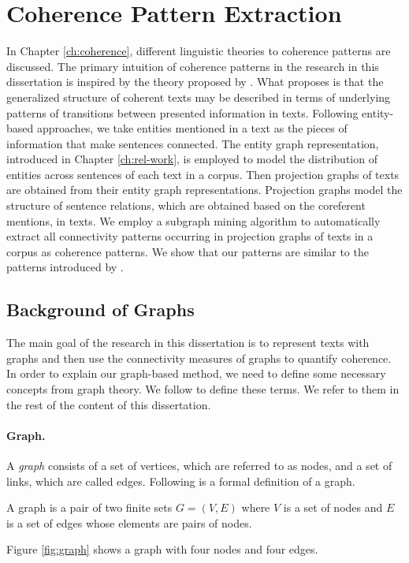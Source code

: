 \section{Coherence Pattern Extraction}
\label{sec:pattern-extraction}

In Chapter \ref{ch:coherence}, different linguistic theories to coherence patterns are discussed. 
The primary intuition of coherence patterns in the research in this dissertation is inspired by the theory proposed by . 
What  proposes is that the generalized structure of coherent texts may be described in terms of underlying patterns of transitions between presented information in texts.  
Following entity-based approaches, we take entities mentioned in a text as the pieces of information that make sentences connected. 
The entity graph representation, introduced in Chapter \ref{ch:rel-work}, is employed to model the distribution of entities across sentences of each text in a corpus.  
Then projection graphs of texts are obtained from their entity graph representations.  
Projection graphs model the structure of sentence relations, which are obtained based on the coreferent mentions, in texts. 
We employ a subgraph mining algorithm to automatically extract all connectivity patterns occurring in projection graphs of texts in a corpus as coherence patterns. 
We show that our patterns are similar to the patterns introduced by . 

\subsection{Background of Graphs}
\label{sec:back-graphs}

The main goal of the research in this dissertation is to represent texts with graphs and then use the connectivity measures of graphs to quantify coherence. 
In order to explain our graph-based method, we need to define some necessary concepts from graph theory.  
We follow  to define these terms. 
We refer to them in the rest of the content of this dissertation.  

\paragraph{Graph.}
A \emph{graph} consists of a set of vertices, which are referred to as nodes, and a set of links, which are called edges. 
Following is a formal definition of a graph. 

\begin{definition}
A graph is a pair of two finite sets $G=( V, E )$ where $V$ is a set of nodes and $E$ is a set of edges whose elements are pairs of nodes. 
\end{definition} 
Figure \ref{fig:graph} shows a graph with four nodes and four edges. 

